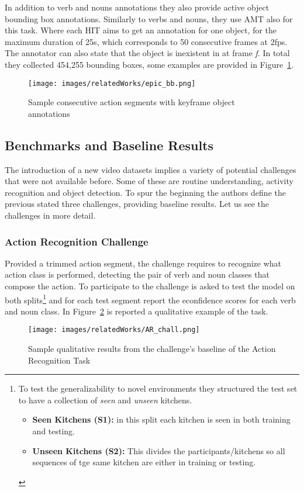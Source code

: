 In addition to verb and nouns annotations they also provide active object bounding box annotations.
Similarly to verbs and nouns, they use AMT also for this task. Where each HIT aims to 
get an annotation for one object, for the maximum duration of 25s, which corresponds
to 50 consecutive frames at 2fps. The annotator can also state that the object is inexistent
in at frame \textit{f}. In total they collected 454,255 bounding boxes, some examples
are provided in Figure~\ref{fig:epic_bb}.
\begin{figure}
    \centering
    \texttt{[image: images/relatedWorks/epic\_bb.png]} 
    \caption{Sample consecutive action segments with keyframe object annotations}\label{fig:epic_bb}
\end{figure}


\subsection{Benchmarks and Baseline Results}
The introduction of a new video datasets implies a variety of potential challenges
that were not available before. Some of these are routine understanding, activity
recognition and object detection. To spur the beginning the authors define 
the previous stated three challenges, providing baseline results.
Let us see the challenges in more detail.

\subsubsection{Action Recognition Challenge} \label{sec:ep_AR_chall}
Provided a trimmed action segment, the challenge requires to recognize
what action class is performed, detecting the pair of verb and noun classes that 
compose the action. To participate to the challenge is asked to test the model
on both splits\footnote{ To test the generalizability to novel environments they 
structured the test set to have a collection of \textit{seen} and \textit{unseen}
kitchens.
\begin{itemize}
    \item \textbf{Seen Kitchens (S1):} in this split each kitchen is seen in both training and testing.
    \item \textbf{Unseen Kitchens (S2):} This divides the participants/kitchens so all sequences
     of tge same kitchen are either in training or testing.
\end{itemize}
} and for each test segment report the econfidence 
scores for each verb and noun class. In Figure~\ref{fig:epic_ar_chall} is reported
a qualitative example of the task.
\begin{figure}
    \centering
    \texttt{[image: images/relatedWorks/AR\_chall.png]} 
    \caption{Sample qualitative results from the challenge's baseline of the Action Recognition Task}\label{fig:epic_ar_chall}
\end{figure}


